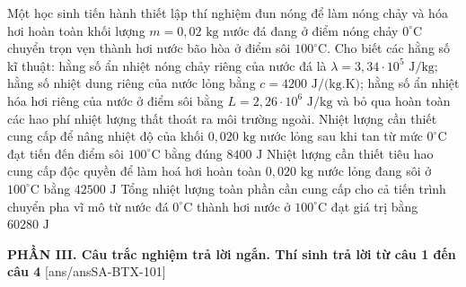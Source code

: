 \begin{ex}	Một học sinh tiến hành thiết lập thí nghiệm đun nóng để làm nóng chảy và hóa hơi hoàn toàn khối lượng $m = 0,02\text{ kg}$ nước đá đang ở điểm nóng chảy $0^\circ\text{C}$ chuyển trọn vẹn thành hơi nước bão hòa ở điểm sôi $100^\circ\text{C}$. Cho biết các hằng số kĩ thuật: hằng số ẩn nhiệt nóng chảy riêng của nước đá là $\lambda = 3,34 \cdot 10^5\text{ J/kg}$; hằng số nhiệt dung riêng của nước lỏng bằng $c = 4200\text{ J/(kg.K)}$; hằng số ẩn nhiệt hóa hơi riêng của nước ở điểm sôi bằng $L = 2,26 \cdot 10^6\text{ J/kg}$ và bỏ qua hoàn toàn các hao phí nhiệt lượng thất thoát ra môi trường ngoài.
	{\True Nhiệt lượng cần thiết cung cấp để nâng nhiệt độ của khối $0,020\text{ kg}$ nước lỏng sau khi tan từ mức $0^\circ\text{C}$ đạt tiến đến điểm sôi $100^\circ\text{C}$ bằng đúng $8400\text{ J}$}
	{Nhiệt lượng cần thiết tiêu hao cung cấp độc quyền để làm hoá hơi hoàn toàn $0,020\text{ kg}$ nước lỏng đang sôi ở $100^\circ\text{C}$ bằng $42500\text{ J}$}
	{\True Tổng nhiệt lượng toàn phần cần cung cấp cho cả tiến trình chuyển pha vĩ mô từ nước đá $0^\circ\text{C}$ thành hơi nước ở $100^\circ\text{C}$ đạt giá trị bằng $60280\text{ J}$}
\end{ex}


\noindent \textbf{PHẦN III. Câu trắc nghiệm trả lời ngắn. Thí sinh trả lời từ câu 1 đến câu 4}
[ans/ansSA-BTX-101]

